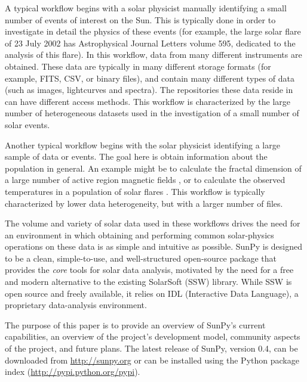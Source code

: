 A typical workflow begins with a solar physicist manually identifying
a small number of events of interest on the Sun.  This is typically
done in order to investigate in detail the physics of these events
(for example, the large solar flare of 23 July 2002 has Astrophysical
Journal Letters volume 595, dedicated to the analysis of this flare).
In this workflow, data from many different instruments are obtained.
These data are typically in many different storage formats (for
example, FITS, CSV, or binary files), and contain many different types
of data (such as images, lightcurves and spectra).  The repositories
these data reside in can have different access methods.  This workflow
is characterized by the large number of heterogeneous datasets used in
the investigation of a small number of solar events.

Another typical workflow begins with the solar physicist identifying a
large sample of data or events.  The goal here is obtain information
about the population in general.  An example might be to calculate the
fractal dimension of a large number of active region magnetic fields
\citep{2005ApJ...631..628M}, or to calculate the observed temperatures
in a population of solar flares \citep{2012ApJS..202...11R}.  This
workflow is typically characterized by lower data heterogeneity, but
with a larger number of files.

The volume and variety of solar data used in these workflows drives
the need for an environment in which obtaining and performing common
solar-physics operations on these data is as simple and intuitive as
possible.  SunPy is designed to be a clean, simple-to-use, and
well-structured open-source package that provides the \textit{core}
tools for solar data analysis, motivated by the need for a free and
modern alternative to the existing SolarSoft (SSW) library. While SSW
is open source and freely available, it relies on IDL (Interactive
Data Language), a proprietary data-analysis environment.

The purpose of this paper is to provide an overview of SunPy's current
capabilities, an overview of the project's development model, community aspects of the
project, and future plans. The latest release of SunPy, version 0.4,
can be downloaded from \url{http://sunpy.org} or can be
installed using the Python package index (\url{http://pypi.python.org/pypi}).
